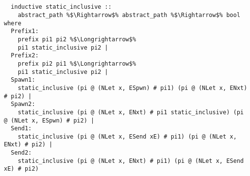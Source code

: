 \begin{lstlisting}[style=codestyle1, escapechar=\%]

  
  inductive static_inclusive ::
    abstract_path %$\Rightarrow$% abstract_path %$\Rightarrow$% bool where
  Prefix1:
    prefix pi1 pi2 %$\Longrightarrow$%
    pi1 static_inclusive pi2 |
  Prefix2:
    prefix pi2 pi1 %$\Longrightarrow$%
    pi1 static_inclusive pi2 |
  Spawn1:
    static_inclusive (pi @ (NLet x, ESpwn) # pi1) (pi @ (NLet x, ENxt) # pi2) |
  Spawn2:
    static_inclusive (pi @ (NLet x, ENxt) # pi1 static_inclusive) (pi @ (NLet x, ESpwn) # pi2) |
  Send1: 
    static_inclusive (pi @ (NLet x, ESend xE) # pi1) (pi @ (NLet x, ENxt) # pi2) |
  Send2:
    static_inclusive (pi @ (NLet x, ENxt) # pi1) (pi @ (NLet x, ESend xE) # pi2)
    
  \end{lstlisting}



